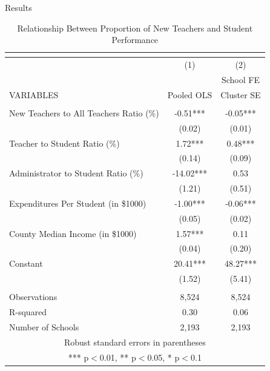 \documentclass[notes]{beamer}
\begin{document}
\begin{frame}{Results}
\begin{table}[hbtp]
    \tiny
    \centering
    \caption{Relationship Between Proportion of New Teachers and Student Performance}
\begin{tabular}{lcc}
\multicolumn{3}{c}{} \\ \hline\hline
 & (1) & (2) \\
 &  & School FE \\
VARIABLES & Pooled OLS & Cluster SE \\ \hline
 &  &  \\
\rowcolor{yellow}New Teachers to All Teachers Ratio (\%) & -0.51*** & -0.05*** \\
 & (0.02) & (0.01) \\
Teacher to Student Ratio (\%) & 1.72*** & 0.48*** \\
 & (0.14) & (0.09) \\
Administrator to Student Ratio (\%) & -14.02*** & 0.53 \\
 & (1.21) & (0.51) \\
Expenditures Per Student (in \$1000) & -1.00*** & -0.06*** \\
 & (0.05) & (0.02) \\
County Median Income (in \$1000) & 1.57*** & 0.11 \\
 & (0.04) & (0.20) \\
Constant & 20.41*** & 48.27*** \\
 & (1.52) & (5.41) \\
 &  &  \\
\hline
Observations & 8,524 & 8,524 \\
R-squared & 0.30 & 0.06 \\
 Number of Schools & 2,193 & 2,193 \\ \hline\hline
\multicolumn{3}{c}{ Robust standard errors in parentheses} \\
\multicolumn{3}{c}{ *** p$<$0.01, ** p$<$0.05, * p$<$0.1} \\
\end{tabular}
\end{table}
\end{frame}
\end{document}
